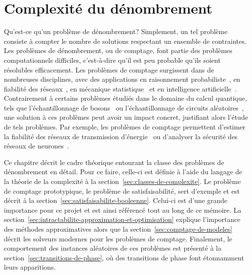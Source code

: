 \chapter{Complexité du dénombrement}
\label{cha:complexite-du-denombrement}

Qu'est-ce qu'un problème de dénombrement? Simplement, un tel problème consiste à compter le nombre de solutions respectant un ensemble de contraintes. Les problèmes de dénombrement, ou de comptage, font partie des problèmes computationnels difficiles, c'est-à-dire qu'il est peu probable qu'ils soient résolubles efficacement. Les problèmes de comptage surgissent dans de nombreuses disciplines, avec des applications en raisonnement probabiliste~\cite{rothHardnessApproximateReasoning1996, sangPerformingBayesianInference2005, abramsonHailfinderBayesianSystem1996}, en fiabilité des réseaux~\cite{valiantComplexityEnumerationReliability1979, duenas-osorioCountingbasedReliabilityEstimation2017}, en mécanique statistique~\cite{jerrumPolynomialTimeApproximationAlgorithms1993} et en intelligence artificielle~\cite{balutaQuantitativeVerificationNeural2019}. Contrairement à certains problèmes étudiés dans le domaine du calcul quantique, tels que l'échantillonnage de bosons~\cite{aaronsonComputationalComplexityLinear2011} ou l'échantillonnage de circuits aléatoires~\cite{boulandComplexityVerificationQuantum2019}, une solution à ces problèmes peut avoir un impact concret, justifiant alors l'étude de tels problèmes. Par exemple, les problèmes de comptage permettent d'estimer la fiabilité des réseaux de transmission d'énergie~\cite{duenas-osorioCountingbasedReliabilityEstimation2017} ou d'analyser la sécurité des réseaux de neurones~\cite{balutaQuantitativeVerificationNeural2019}.

Ce chapitre décrit le cadre théorique entourant la classe des problèmes de dénombrement en détail. Pour ce faire, celle-ci est définie à l'aide du langage de la théorie de la complexité à la section~\ref{sec:classes-de-complexite}. Le problème de comptage prototypique, le problème de satisfaisabilité, sert d'exemple et est décrit à la section~\ref{sec:satisfaisabilite-booleenne}. Celui-ci est d'une grande importance pour ce projet et est ainsi référencé tout au long de ce mémoire. La section~\ref{sec:intractabilite-approximation-et-optimisation} explique l'importance des méthodes approximatives alors que la section~\ref{sec:comptage-de-modeles} décrit les solveurs modernes pour les problèmes de comptage. Finalement, le comportement des instances aléatoires de ces problèmes est présenté à la section~\ref{sec:transitions-de-phase}, où des transitions de phase font étonnamment leurs apparitions.

